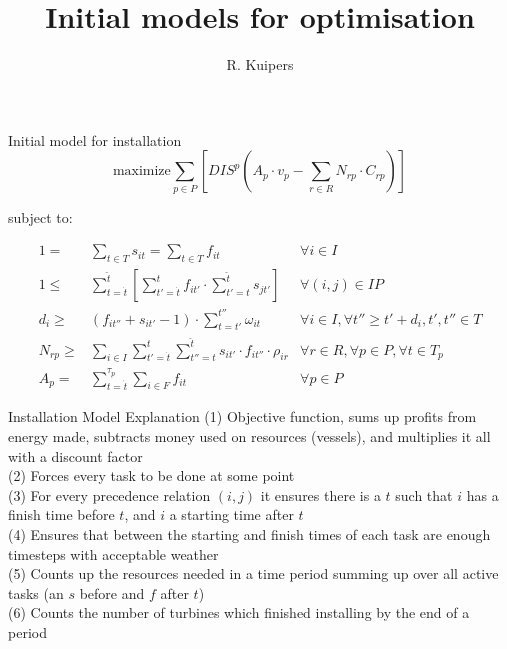 \documentclass{beamer}
\title[Initial models for optimisation]{Initial models for optimisation}
\author{R. Kuipers}
\begin{document}
\begin{frame}
  \titlepage
\end{frame}

\begin{frame}{Initial model for installation}
\footnotesize
\begin{equation}
	\text{maximize} \sum_{p \in P} [ DIS^p (A_p \cdot v_p - \sum_{r \in R} N_{rp} \cdot C_{rp}) ]
\end{equation}

\bigskip
subject to:

\begin{align}
1 =& \sum_{t \in T} s_{it}	= \sum_{t \in T} f_{it}										&	\forall i \in I 						\\
1 \leq& \sum_{t = \dot{t}}^{\hat{t}} [ \sum_{t' = \dot{t}}^t f_{it'} \cdot \sum_{t' = t}^{\hat{t}} s_{jt'} ]	&	\forall (i, j) \in IP					\\
d_i \geq& (f_{it''} + s_{it'} - 1) \cdot \sum_{t = t'}^{t''} \omega_{it} 							& 	\forall i \in I, 	\forall t'' \geq t' + d_i, t', t'' \in T	\\
N_{rp} \geq& \sum_{i\in I} \sum_{t' = \dot{t}}^t \sum_{t'' = t}^{\hat{t}} s_{it'} \cdot f_{it''} \cdot \rho_{ir}	& 	\forall r \in R, \forall p \in P, \forall t \in T_p 	\\
A_p =&  \sum_{ t = \dot{t}}^{\tau_p} \sum_{i \in F} f_{it}									&	\forall p \in P
\end{align}

\end{frame}

\begin{frame}{Installation Model Explanation}
(1) Objective function, sums up profits from energy made, subtracts money used on resources (vessels), and multiplies it all with a discount factor	\\
(2) Forces every task to be done at some point	\\
(3) For every precedence relation $(i, j)$ it ensures there is a $t$ such that $i$ has a finish time before $t$, and $i$ a starting time after $t$	\\
(4) Ensures that between the starting and finish times of each task are enough timesteps with acceptable weather	\\
(5) Counts up the resources needed in a time period summing up over all active tasks (an $s$ before and $f$ after $t$)	\\
(6) Counts the number of turbines which finished installing by the end of a period	
\end{frame}
\end{document}
